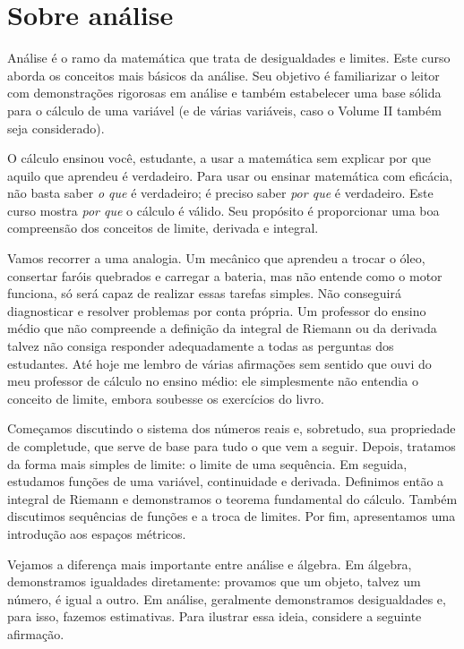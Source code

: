 
\sectionnewpage
\section{Sobre análise} \label{sec:aboutra}

Análise é o ramo da matemática que trata de desigualdades e limites. Este
curso aborda os conceitos mais básicos da análise. Seu objetivo é familiarizar
o leitor com demonstrações rigorosas em análise e também estabelecer uma base
sólida para o cálculo de uma variável (e de várias variáveis, caso o Volume II
também seja considerado).

O cálculo ensinou você, estudante, a usar a matemática sem explicar por que
aquilo que aprendeu é verdadeiro. Para usar ou ensinar matemática com
eficácia, não basta saber \emph{o que} é verdadeiro; é preciso saber
\emph{por que} é verdadeiro. Este curso mostra \emph{por que} o cálculo é
válido. Seu propósito é proporcionar uma boa compreensão dos conceitos de
limite, derivada e integral.

Vamos recorrer a uma analogia.
Um mecânico que aprendeu a trocar o óleo, consertar faróis quebrados e carregar
a bateria, mas não entende como o motor funciona, só será capaz de realizar
essas tarefas simples. Não conseguirá diagnosticar e resolver problemas por
conta própria.
Um professor do ensino médio que não compreende a definição da integral de
Riemann ou da derivada talvez não consiga responder adequadamente a todas as
perguntas dos estudantes.
Até hoje me lembro de várias afirmações sem sentido que ouvi do meu professor
de cálculo no ensino médio: ele simplesmente não entendia o conceito de
limite, embora soubesse  os exercícios do livro.

\medskip

Começamos discutindo o sistema dos números reais e, sobretudo, sua propriedade
de completude, que serve de base para tudo o que vem a seguir.
Depois, tratamos da forma mais simples de limite: o limite de uma sequência.
Em seguida, estudamos funções de uma variável, continuidade e derivada.
Definimos então a integral de Riemann e demonstramos o teorema fundamental
do cálculo. Também discutimos sequências de funções e a troca de limites.
Por fim, apresentamos uma introdução aos espaços métricos.

\medskip

Vejamos a diferença mais importante entre análise e álgebra.
Em álgebra, demonstramos igualdades diretamente: provamos que um objeto,
talvez um número, é igual a outro.
Em análise, geralmente demonstramos desigualdades e, para isso, fazemos
estimativas.
Para ilustrar essa ideia, considere a seguinte afirmação.

